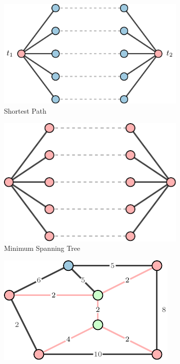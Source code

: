 \documentclass[11pt,psfig,times]{article}
\begin{document}
\begin{figure}[H]
	\begin{center}
		\begin{subfigure}[b]{0.3\textwidth}
			\includegraphics[width=\textwidth]{pictures/shortestpath.pdf}
			\caption{Shortest Path}
		\end{subfigure}
		\hspace{10pt}
		\begin{subfigure}[b]{0.25\textwidth}
			\includegraphics[width=\textwidth]{pictures/mst.pdf}
			\caption{Minimum Spanning Tree}
		\end{subfigure}
		\hspace{10pt}
		\begin{subfigure}[b]{0.25\textwidth}
			\includegraphics[width=\textwidth]{pictures/steinertree.pdf}

\end{subfigure}
\end{center}
\end{figure}
\end{document}
